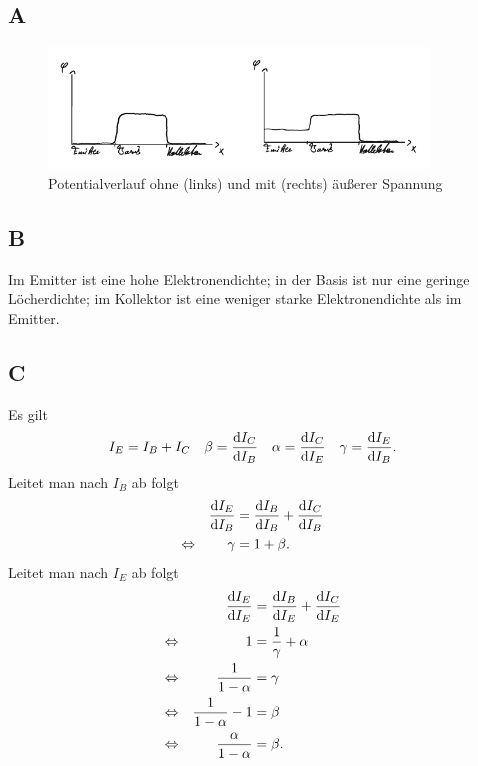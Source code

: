 \documentclass[a4paper,12pt]{article}
\numberwithin{equation}{section}
\begin{document}
\subsection{A}
\begin{figure}[h]
        \centering
        \includegraphics[width=0.9\textwidth]{A_crop.pdf}
        \caption[Potentialverlauf ohne und mit äußerer Spannung]{Potentialverlauf ohne (links) und mit (rechts) äußerer Spannung}
\end{figure}

\subsection{B}
Im Emitter ist eine hohe Elektronendichte; in der Basis ist nur eine geringe Löcherdichte; im Kollektor ist eine weniger starke Elektronendichte als im Emitter.

\subsection{C}
Es gilt 
\begin{align} 
        I_E&=I_B+I_C&\beta &=\diff[]{I_C}{I_B}&\alpha &=\diff[]{I_C}{I_E}&\gamma &=\diff[]{I_E}{I_B}
.\end{align} 
Leitet man nach $I_B$ ab folgt 
\begin{align} 
        &&\diff[]{I_E}{I_B}&=\diff[]{I_B}{I_B}+\diff[]{I_C}{I_B}&&\\
        \Leftrightarrow &&\gamma &=1+\beta .&&
\end{align} 
Leitet man nach $I_E$ ab folgt
\begin{align} 
        &&\diff[]{I_E}{I_E}&=\diff[]{I_B}{I_E}+\diff[]{I_C}{I_E}&&\\
        \Leftrightarrow &&1&=\dfrac{1}{\gamma }+\alpha &&\nonumber \\
        \Leftrightarrow &&\dfrac{1}{1-\alpha }&=\gamma &&\nonumber \\
        \Leftrightarrow &&\dfrac{1}{1-\alpha }-1&=\beta &&\nonumber \\
        \Leftrightarrow &&\dfrac{\alpha }{1-\alpha }&=\beta .&&
\end{align} 
\end{document}

